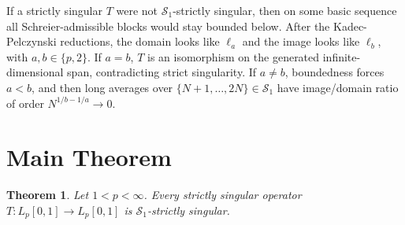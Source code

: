 \documentclass[11pt]{article}
\newtheorem{theorem}{Theorem}
\newcommand{\Lp}{L_p[0,1]}
\newcommand{\Sone}{\mathcal S_1}
\begin{document}
If a strictly singular $T$ were not $\Sone$-strictly singular, then on some
basic sequence all Schreier-admissible blocks would stay bounded below.  After
the Kadec-Pelczynski reductions, the domain looks like $\ell_a$ and the image
looks like $\ell_b$, with $a,b\in\{p,2\}$.  If $a=b$, $T$ is an isomorphism on
the generated infinite-dimensional span, contradicting strict singularity.  If
$a\ne b$, boundedness forces $a<b$, and then long averages over
$\{N+1,\ldots,2N\}\in\Sone$ have image/domain ratio of order
$N^{1/b-1/a}\to0$.

\section*{Main Theorem}

\begin{theorem}\label{thm:lp-s1}
Let $1<p<\infty$.  Every strictly singular operator
$T:\Lp\to\Lp$ is $\Sone$-strictly singular.
\end{theorem}
\end{document}

